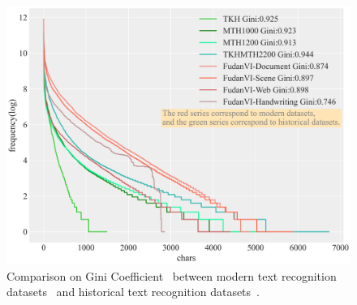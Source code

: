 \begin{figure}[!t]
	\centering
	\includegraphics[width=\linewidth]{figures/database_long_tail.png}
	\caption
    {Comparison on Gini Coefficient~\cite{tailsurvey} between modern text recognition datasets~\cite{fudanvi} and historical text recognition datasets~\cite{tkhmth}.}
	\label{fig:moretailed}
\end{figure}